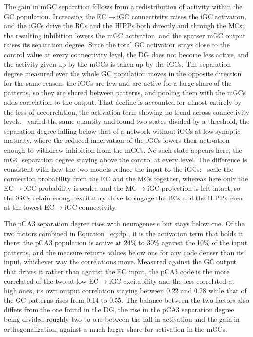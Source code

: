 The gain in mGC separation follows from a redistribution of activity within the GC population. Increasing the EC$\to$iGC
connectivity raises the iGC activation, and the iGCs drive the BCs and the HIPPs both directly and through the MCs; the resulting
inhibition lowers the mGC activation, and the sparser mGC output raises its separation degree. Since the total GC activation stays
close to the control value at every connectivity level, the DG does not become less active, and the activity given up by the mGCs
is taken up by the iGCs. The separation degree measured over the whole GC population moves in the opposite direction for the same
reason: the iGCs are few and are active for a large share of the patterns, so they are shared between patterns, and pooling them
with the mGCs adds correlation to the output. That decline is accounted for almost entirely by the loss of decorrelation, the
activation term showing no trend across connectivity levels.\ \textcite{kimEffect2024} varied the same quantity and found two
states divided by a threshold, the separation degree falling below that of a network without iGCs at low synaptic maturity, where
the reduced innervation of the iGCs lowers their activation enough to withdraw inhibition from the mGCs. No such state appears
here, the mGC separation degree staying above the control at every level. The difference is consistent with how the two models
reduce the input to the iGCs:~\textcite{kimEffect2024} scale the connection probability from the EC and the MCs together, whereas
here only the EC$\to$iGC probability is scaled and the MC$\to$iGC projection is left intact, so the iGCs retain enough excitatory
drive to engage the BCs and the HIPPs even at the lowest EC$\to$iGC connectivity.

The pCA3 separation degree rises with neurogenesis but stays below one. Of the two factors combined in Equation~\ref{eq:dp}, it is
the activation term that holds it there: the pCA3 population is active at 24\% to 30\% against the 10\% of the input patterns, and
the measure returns values below one for any code denser than its input, whichever way the correlations move. Measured against the
GC output that drives it rather than against the EC input, the pCA3 code is the more correlated of the two at low EC$\to$iGC
excitability and the less correlated at high ones, its own output correlation staying between $0.22$ and $0.28$ while that of the
GC patterns rises from $0.14$ to $0.55$. The balance between the two factors also differs from the one found in the DG, the rise
in the pCA3 separation degree being divided roughly two to one between the fall in activation and the gain in orthogonalization,
against a much larger share for activation in the mGCs.


